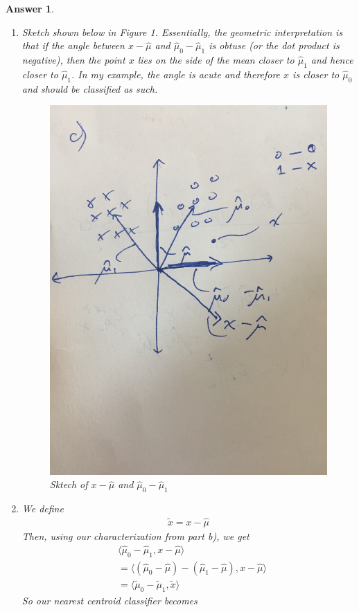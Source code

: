 \documentclass[12pt]{article}
\theoremstyle{colon}
\newtheorem*{answer}{Answer}
\begin{document}
\begin{answer}
\begin{enumerate}[label=\alph*)]
    \item Sketch shown below in Figure 1. Essentially, the geometric interpretation is that if the angle between $x - \hat{\mu}$ and $\hat{\mu}_0 - \hat{\mu}_1$ is obtuse (or the dot product is negative), then the point $x$ lies on the side of the mean closer to $\hat{\mu}_1$ and hence closer to $\hat{\mu}_1$. In my example, the angle is acute and therefore $x$ is closer to $\hat{\mu}_0$ and should be classified as such.
      \begin{figure}[H]
        \centering
          \includegraphics[width=\textwidth]{q1c}
        \caption{Sktech of $x - \hat{\mu}$ and $\hat{\mu}_0 - \hat{\mu}_1$}
      \end{figure}

    \item We define
      \begin{gather*}
        \tilde{x} = x - \hat{\mu}
      \end{gather*}
      Then, using our characterization from part b), we get
      \begin{align*}
        & \langle \hat{\mu}_0 - \hat{\mu}_1, x - \hat{\mu} \rangle \\
        &= \langle (\hat{\mu}_0 - \hat{\mu}) - (\hat{\mu}_1 - \hat{\mu}), x - \hat{\mu} \rangle \\
        &= \langle \tilde{\mu}_0 - \tilde{\mu}_1, \tilde{x} \rangle
      \end{align*}
      So our nearest centroid classifier becomes


\end{enumerate}
\end{answer}
\end{document}
